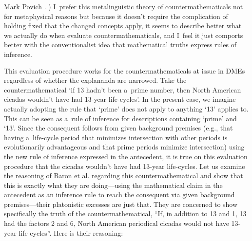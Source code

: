 \begin{artengenv}{Mark Povich}
{%
\parencite[][p.303]{bennett_philosophical_2003}.%
) I~prefer this metalinguistic theory of countermathematicals not for metaphysical reasons but because it doesn't require the complication of holding fixed that the changed concepts apply, it seems to describe better what we actually do when evaluate countermathematicals, and I~feel it just comports better with the conventionalist idea that mathematical truths express rules of inference.}

This evaluation procedure works for the countermathematicals at issue in DMEs regardless of whether the explananda are narrowed. Take the countermathematical ‘if 13 hadn't been a~prime number, then North American cicadas wouldn't have had 13-year life-cycles'. In the present case, we imagine actually adopting the rule that ‘prime' does not apply to anything ‘13' applies to. This can be seen as a~rule of inference for descriptions containing ‘prime' and ‘13'. Since the consequent follows from given background premises (e.g., that having a~life-cycle period that minimizes intersection with other periods is evolutionarily advantageous and that prime periods minimize intersection) using the new rule of inference expressed in the antecedent, it is true on this evaluation procedure that the cicadas wouldn't have had 13-year life-cycles. Let us examine the reasoning of Baron et al.
\parencite*[][p.11]{baron_how_2017} %
 regarding this countermathematical and show that this is exactly what they are doing---using the mathematical claim in the antecedent as an inference rule to reach the consequent via given background premises---their platonistic excesses are just that. They are concerned to show specifically the truth of the countermathematical, ``If, in addition to 13 and 1, 13 had the factors 2 and 6, North American periodical cicadas would not have 13-year life cycles''. Here is their reasoning:
\end{artengenv}
